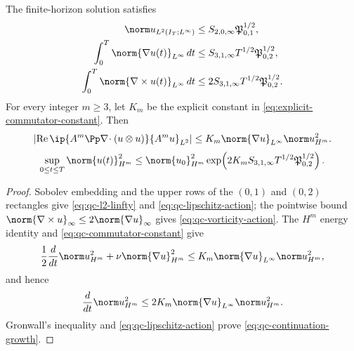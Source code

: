 \begin{proposition}
\label{prop:qc-continuation-norms}
The finite-horizon solution satisfies
\begin{align}
 \norm u_{L^2(I_T;L^\infty)}
 &\le S_{2,0,\infty}\mathfrak P_{0,1}^{1/2},
 \label{eq:qc-l2-linfty}\\
 \int_0^T\norm{\nabla u(t)}_{L^\infty}\,dt
 &\le S_{3,1,\infty}T^{1/2}\mathfrak P_{0,2}^{1/2},
 \label{eq:qc-lipschitz-action}\\
 \int_0^T\norm{\nabla\times u(t)}_{L^\infty}\,dt
 &\le 2S_{3,1,\infty}T^{1/2}\mathfrak P_{0,2}^{1/2}.
 \label{eq:qc-vorticity-action}
\end{align}
For every integer \(m\ge3\), let \(K_m\) be the explicit constant in
\eqref{eq:explicit-commutator-constant}.  Then
\begin{equation}
 \left|\operatorname{Re}
 \ip{A^m\Pp\nabla\!\cdot(u\otimes u)}{A^m u}_{L^2}\right|
 \le K_m\norm{\nabla u}_{L^\infty}\norm u_{H^m}^2.
 \label{eq:qc-commutator-constant}
\end{equation}
\begin{equation}
 \sup_{0\le t\le T}\norm{u(t)}_{H^m}^2
 \le
 \norm{u_0}_{H^m}^2
 \exp\!\left(
 2K_mS_{3,1,\infty}T^{1/2}\mathfrak P_{0,2}^{1/2}
 \right).
 \label{eq:qc-continuation-growth}
\end{equation}
\end{proposition}

\begin{proof}
Sobolev embedding and the upper rows of the \((0,1)\) and \((0,2)\)
rectangles give \eqref{eq:qc-l2-linfty} and
\eqref{eq:qc-lipschitz-action}; the pointwise bound
\(\norm{\nabla\times u}_\infty\le2\norm{\nabla u}_\infty\) gives
\eqref{eq:qc-vorticity-action}.  The \(H^m\) energy identity and
\eqref{eq:qc-commutator-constant} give
\[
 \frac12\frac d{dt}\norm u_{H^m}^2
 +\nu\norm{\nabla u}_{H^m}^2
 \le K_m\norm{\nabla u}_{L^\infty}\norm u_{H^m}^2,
\]
and hence
\[
 \frac d{dt}\norm u_{H^m}^2
 \le2K_m\norm{\nabla u}_{L^\infty}\norm u_{H^m}^2.
\]
Gronwall's inequality and \eqref{eq:qc-lipschitz-action} prove
\eqref{eq:qc-continuation-growth}.
\end{proof}


